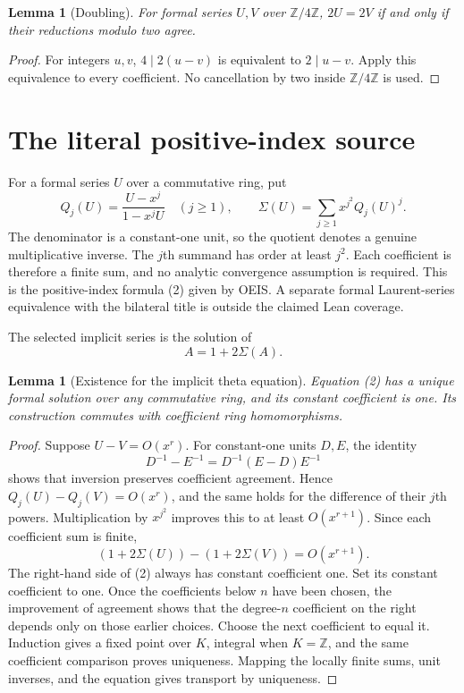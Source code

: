 \documentclass[11pt,a4paper]{article}
\newtheorem{lemma}[theorem]{Lemma}
\theoremstyle{remark}
\newcommand{\Z}{\mathbb Z}
\begin{document}
\begin{lemma}[Doubling]\label{lem:binary}
For formal series $U,V$ over $\Z/4\Z$, $2U=2V$ if and only if their
reductions modulo two agree.
\end{lemma}
\begin{proof}
For integers $u,v$, $4\mid2(u-v)$ is equivalent to $2\mid u-v$. Apply
this equivalence to every coefficient. No cancellation by two inside
$\Z/4\Z$ is used.
\end{proof}

\section{The literal positive-index source}

For a formal series $U$ over a commutative ring, put
\[
 Q_j(U)=\frac{U-x^j}{1-x^jU}\quad(j\ge1),\qquad
 \Sigma(U)=\sum_{j\ge1}x^{j^2}Q_j(U)^j. \tag{1}
\]
The denominator is a constant-one unit, so the quotient denotes a genuine
multiplicative inverse. The $j$th summand has order at least $j^2$.
Each coefficient is therefore a finite sum, and no analytic convergence
assumption is required. This is the positive-index formula (2) given by OEIS.
A separate formal Laurent-series equivalence with the bilateral title is
outside the claimed Lean coverage.

The selected implicit series is the solution of
\[
 A=1+2\Sigma(A). \tag{2}
\]
\begin{lemma}[Existence for the implicit theta equation]\label{lem:thetaexist}
Equation (2) has a unique formal solution over any commutative ring, and
its constant coefficient is one. Its construction commutes with
coefficient ring homomorphisms.
\end{lemma}

\begin{proof}
Suppose $U-V=O(x^r)$. For constant-one units $D,E$, the identity
\[
 D^{-1}-E^{-1}=D^{-1}(E-D)E^{-1}
\]
shows that inversion preserves coefficient agreement. Hence
$Q_j(U)-Q_j(V)=O(x^r)$, and the same holds for the difference of their
$j$th powers. Multiplication by $x^{j^2}$ improves this to at least
$O(x^{r+1})$. Since each coefficient sum is finite,
\[
 (1+2\Sigma(U))-(1+2\Sigma(V))=O(x^{r+1}).
\]
The right-hand side of (2) always has constant coefficient one. Set its constant coefficient to one. Once the coefficients below
$n$ have been chosen, the improvement of agreement shows that the degree-$n$
coefficient on the right depends only on those earlier choices. Choose the
next coefficient to equal it. Induction gives a fixed point over $K$, integral when $K=\Z$, and
the same coefficient comparison proves uniqueness. Mapping the locally finite
sums, unit inverses, and the equation gives transport by uniqueness.
\end{proof}
\end{document}
